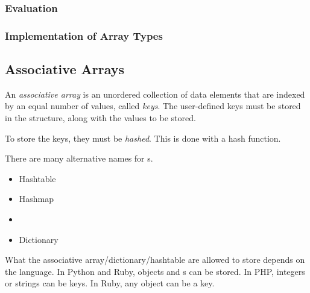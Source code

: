 \subsubsection{Evaluation}\label{subsubsec:Arrays-Evaluation}
\subsubsection{Implementation of Array Types}\label{subsubsec:Arrays-Implementation}

\subsection{Associative Arrays}\label{subsec:Associative_Arrays}
\begin{definition}\label{def:Associative_Array}
  An \emph{associative array} is an unordered collection of data elements that are indexed by an equal number of values, called \emph{keys}.
  The user-defined keys must be stored in the structure, along with the values to be stored.

  To store the keys, they must be \emph{hashed}.
  This is done with a hash function.

  \begin{remark}
    There are many alternative names for s.
    \begin{itemize}[noitemsep]
    \item Hashtable
    \item Hashmap
    \item {}
    \item Dictionary
    \end{itemize}
  \end{remark}

  \begin{remark}
    What the associative array/dictionary/hashtable are allowed to store depends on the language.
    In Python and Ruby, objects and s can be stored.
    In PHP, integers or strings can be keys.
    In Ruby, any object can be a key.
  \end{remark}
\end{definition}


